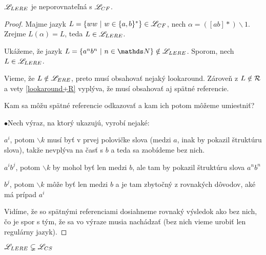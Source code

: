 \begin{veta}\label{lelcf}
$\mathscr{L}_{LERE}$ je neporovnateľná s $ \mathscr{L}_{CF}$.
\end{veta}
\begin{proof}
Majme jazyk $L=\lbrace ww~|~w \in \lbrace a,b \rbrace^* \rbrace \in \mathscr{L}_{CF}$, nech $ \alpha = ([ab]*)\backslash 1 $.
Zrejme $ L(\alpha) = L $, teda $L\in \mathscr{L}_{LERE}$.

Ukážeme, že jazyk $L=\lbrace a^nb^n~|~n \in \N \rbrace \notin \lel$. Sporom, nech $L \in \mathscr{L}_{LERE}$. 

Vieme, že $L \notin \mathscr{L}_{ERE}$, preto musí obsahovať nejaký lookaround. Zároveň z $L \notin {\cal R}$ a vety \ref{lookaround+R} vyplýva, že musí obsahovať aj spätné referencie.

Kam sa môžu spätné referencie odkazovať a kam ich potom môžeme umiestniť?
\begin{list}{$\bullet$}{Nech výraz, na ktorý ukazujú, vyrobí nejaké:}
\item $a^i$, potom $\backslash k$ musí byť v prvej polovičke slova (medzi $a$, inak by pokazil štruktúru slova), takže nevplýva na časť s $b$ a teda sa zaobídeme bez nich.
\item $a^ib^j$, potom $\backslash k$ by mohol byť len medzi $b$, ale tam by pokazil štruktúru slova $a^nb^n$
\item $b^j$, potom $\backslash k$ môže byť len medzi $b$ a je tam zbytočný z rovnakých dôvodov, aké má prípad $a^i$
\end{list}
Vidíme, že so spätnými referenciami dosiahneme rovnaký výsledok ako bez nich, čo je spor s tým, že sa vo výraze musia nachádzať (bez nich vieme urobiť len regulárny jazyk).
\end{proof}

\begin{dosledok}
$\mathscr{L}_{LERE} \subsetneq \mathscr{L}_{CS}$
\end{dosledok}

